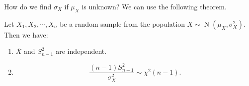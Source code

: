 \documentclass{huhtakm-template-book-v2}
\DeclareMathOperator{\N}{N}
\begin{document}
    How do we find $\sigma_{X}$ if $\mu_{X}$ is unknown? We can use the following theorem.
    \begin{thm}
        \label{Chapter 7 (Theorem) Sampling distribution with sample variance}
        Let $X_{1},X_{2},\cdots,X_{n}$ be a random sample from the population $X \sim \N(\mu_{X},\sigma_{X}^{2})$. Then we have:
        \begin{enumerate}
            \item $\overline{X}$ and $S_{n-1}^{2}$ are independent.
            \item \begin{equation*}
                \frac{(n-1)S_{n-1}^{2}}{\sigma_{X}^{2}} \sim \chi^{2}(n-1).
            \end{equation*}
        \end{enumerate}
    \end{thm}
\end{document}

